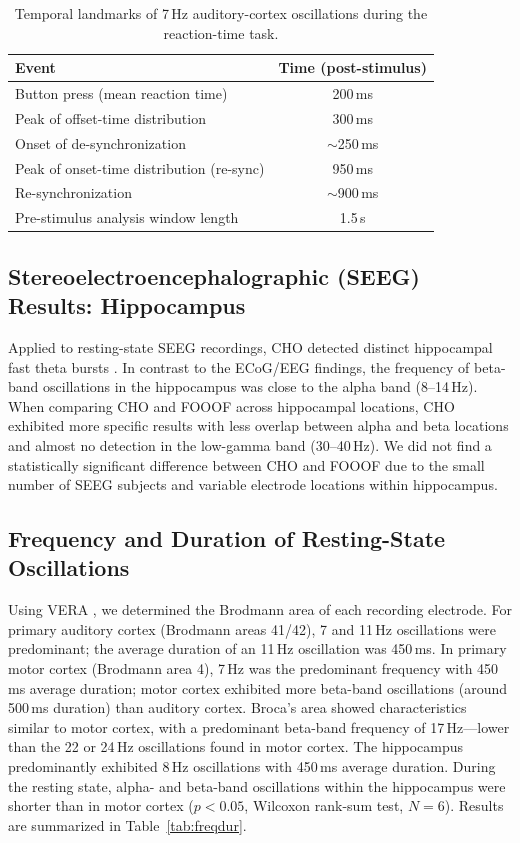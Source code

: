 \documentclass[11pt]{article}
\begin{document}
\begin{table}[htbp]
\centering
\caption{Temporal landmarks of 7\,Hz auditory-cortex oscillations during the reaction-time task.}
\label{tab:timings}
\begin{tabular}{lc}
\toprule
Event & Time (post-stimulus) \\
\midrule
Button press (mean reaction time)         & 200\,ms \\
Peak of offset-time distribution          & 300\,ms \\
Onset of de-synchronization               & $\sim$250\,ms \\
Peak of onset-time distribution (re-sync) & 950\,ms \\
Re-synchronization                        & $\sim$900\,ms \\
Pre-stimulus analysis window length       & 1.5\,s \\
\bottomrule
\end{tabular}
\end{table}

\subsection{Stereoelectroencephalographic (SEEG) Results: Hippocampus}
Applied to resting-state SEEG recordings, CHO detected distinct hippocampal fast theta bursts \citep{lega2012,goyal2020}. In contrast to the ECoG/EEG findings, the frequency of beta-band oscillations in the hippocampus was close to the alpha band (8--14\,Hz). When comparing CHO and FOOOF across hippocampal locations, CHO exhibited more specific results with less overlap between alpha and beta locations and almost no detection in the low-gamma band (30--40\,Hz). We did not find a statistically significant difference between CHO and FOOOF due to the small number of SEEG subjects and variable electrode locations within hippocampus.

\subsection{Frequency and Duration of Resting-State Oscillations}
Using VERA \citep{adamek2022}, we determined the Brodmann area of each recording electrode. For primary auditory cortex (Brodmann areas 41/42), 7 and 11\,Hz oscillations were predominant; the average duration of an 11\,Hz oscillation was 450\,ms. In primary motor cortex (Brodmann area 4), 7\,Hz was the predominant frequency with 450\,ms average duration; motor cortex exhibited more beta-band oscillations (around 500\,ms duration) than auditory cortex. Broca's area showed characteristics similar to motor cortex, with a predominant beta-band frequency of 17\,Hz---lower than the 22 or 24\,Hz oscillations found in motor cortex. The hippocampus predominantly exhibited 8\,Hz oscillations with 450\,ms average duration. During the resting state, alpha- and beta-band oscillations within the hippocampus were shorter than in motor cortex ($p<0.05$, Wilcoxon rank-sum test, $N=6$). Results are summarized in Table~\ref{tab:freqdur}.
\end{document}
